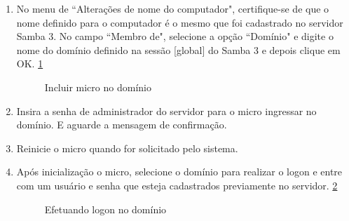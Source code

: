 \begin{enumerate}
	\item {No menu de ``Alterações de nome do computador", certifique-se de que o nome definido para o computador é o mesmo que foi cadastrado no servidor Samba 3. No campo ``Membro de", selecione a opção ``Domínio" e digite o nome do domínio definido na sessão [global] do Samba 3 e depois clique em OK. \ref{incluir_dominio}} 
			\begin{figure}[ht]
		   			\centering
		   			\caption{Incluir micro no domínio}
		    		\label{incluir_dominio}
			\end{figure}
	 
	
	\item {Insira a senha de administrador do servidor para o micro ingressar no domínio. E aguarde a mensagem de confirmação.} 
	
	\item {Reinicie o micro quando for solicitado pelo sistema.}

	\item {Após inicialização o micro, selecione o domínio para realizar o logon e entre com um usuário e senha que esteja cadastrados previamente no servidor. \ref{logon}}
	\begin{figure}[ht]
			\centering
			\caption{Efetuando logon no domínio}
			\label{logon}
	\end{figure}

\end{enumerate}

